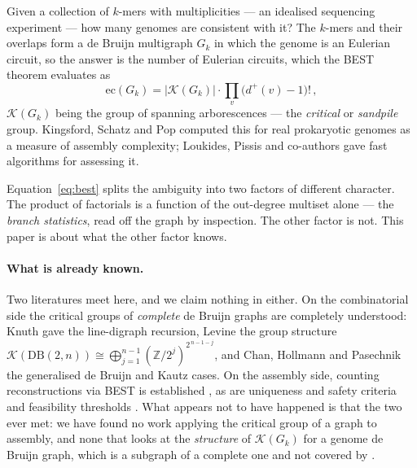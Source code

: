 \documentclass[11pt]{article}
\theoremstyle{plain}
\theoremstyle{definition}
\theoremstyle{remark}
\newcommand{\Z}{\mathbb{Z}}
\newcommand{\K}{\mathcal{K}}
\newcommand{\ec}{\mathrm{ec}}
\newcommand{\DB}{\mathrm{DB}}
\begin{document}
Given a collection of $k$-mers with multiplicities --- an idealised sequencing experiment
--- how many genomes are consistent with it? The $k$-mers and their overlaps form a de
Bruijn multigraph $G_k$ in which the genome is an Eulerian circuit, so the answer is the
number of Eulerian circuits, which the BEST theorem \cite{AEdB,SmithTutte} evaluates as
\begin{equation}\label{eq:best}
\ec(G_k)=\bigl|\K(G_k)\bigr|\cdot\prod_{v}\bigl(d^{+}(v)-1\bigr)!\,,
\end{equation}
$\K(G_k)$ being the group of spanning arborescences --- the \emph{critical} or
\emph{sandpile} group. Kingsford, Schatz and Pop \cite{KSP} computed this for real
prokaryotic genomes as a measure of assembly complexity; Loukides, Pissis and co-authors
\cite{Loukides} gave fast algorithms for assessing it.

Equation~\eqref{eq:best} splits the ambiguity into two factors of different character. The
product of factorials is a function of the out-degree multiset alone --- the \emph{branch
statistics}, read off the graph by inspection. The other factor is not. This paper is
about what the other factor knows.

\paragraph{What is already known.}
Two literatures meet here, and we claim nothing in either. On the combinatorial side the
critical groups of \emph{complete} de Bruijn graphs are completely understood: Knuth
\cite{Knuth} gave the line-digraph recursion, Levine \cite{Levine} the group structure
$\K(\DB(2,n))\cong\bigoplus_{j=1}^{n-1}(\Z/2^{j})^{2^{\,n-1-j}}$, and Chan, Hollmann and
Pasechnik \cite{CHP} the generalised de Bruijn and Kautz cases. On the assembly side,
counting reconstructions via BEST is established \cite{KSP,Loukides}, as are uniqueness and
safety criteria \cite{ObscuraTomescu} and feasibility thresholds \cite{BBT,NagarajanPop}.
What appears not to have happened is that the two ever met: we have found no work applying
the critical group of a graph to assembly, and none that looks at the \emph{structure} of
$\K(G_k)$ for a genome de Bruijn graph, which is a subgraph of a complete one and not
covered by \cite{Levine,CHP}.
\end{document}
